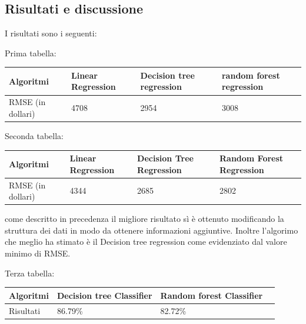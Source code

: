\documentclass{article}
\begin{document}
\subsection{Risultati e discussione}
I risultati sono i seguenti:

Prima tabella:

\begin{tabular}{|p{}|p{}|p{}|p{}|}
\hline
Algoritmi &Linear Regression          & Decision tree regression         &random forest regression      \\
\hline
RMSE (in dollari)     & 4708     & 2954                & 3008           \\
\hline
\end{tabular}

Seconda tabella:

\begin{tabular}{|p{}|p{}|p{}|p{}|}
\hline
Algoritmi &Linear Regression          & Decision Tree Regression         &Random Forest Regression      \\
\hline
RMSE (in dollari) &4344 &2685 &2802\\
\hline
\end{tabular}

come descritto in precedenza il migliore risultato sì è ottenuto modificando la struttura dei dati in modo da ottenere informazioni aggiuntive. Inoltre l'algorimo che meglio ha stimato è il Decision tree regression come evidenziato dal valore minimo di RMSE.

Terza tabella: 

\begin{tabular}{|p{}|p{}|p{}|p{}|}
\hline
Algoritmi          & Decision tree Classifier         &Random forest Classifier      \\
\hline
Risultati           & 86.79\%    & 82.72\%  \\
\hline
\end{tabular}
\end{document}
